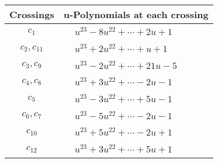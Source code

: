 \documentclass[1p]{elsarticle_modified}
\theoremstyle{definition}
\begin{document}
\begin{tabular}{m{50pt}|m{274pt}}
Crossings & \hspace{64pt}u-Polynomials at each crossing \\
\hline $$\begin{aligned}c_{1}\end{aligned}$$&$\begin{aligned}
&u^{23}-8 u^{22}+\cdots+2 u+1
\end{aligned}$\\
\hline $$\begin{aligned}c_{2},c_{11}\end{aligned}$$&$\begin{aligned}
&u^{23}+2 u^{22}+\cdots+u+1
\end{aligned}$\\
\hline $$\begin{aligned}c_{3},c_{9}\end{aligned}$$&$\begin{aligned}
&u^{23}-2 u^{22}+\cdots+21 u-5
\end{aligned}$\\
\hline $$\begin{aligned}c_{4},c_{8}\end{aligned}$$&$\begin{aligned}
&u^{23}+3 u^{22}+\cdots-2 u-1
\end{aligned}$\\
\hline $$\begin{aligned}c_{5}\end{aligned}$$&$\begin{aligned}
&u^{23}-3 u^{22}+\cdots+5 u-1
\end{aligned}$\\
\hline $$\begin{aligned}c_{6},c_{7}\end{aligned}$$&$\begin{aligned}
&u^{23}-5 u^{22}+\cdots-2 u-1
\end{aligned}$\\
\hline $$\begin{aligned}c_{10}\end{aligned}$$&$\begin{aligned}
&u^{23}+5 u^{22}+\cdots-2 u+1
\end{aligned}$\\
\hline $$\begin{aligned}c_{12}\end{aligned}$$&$\begin{aligned}
&u^{23}+3 u^{22}+\cdots+5 u+1
\end{aligned}$\\
\hline
\end{tabular}\\~\\
\end{document}
